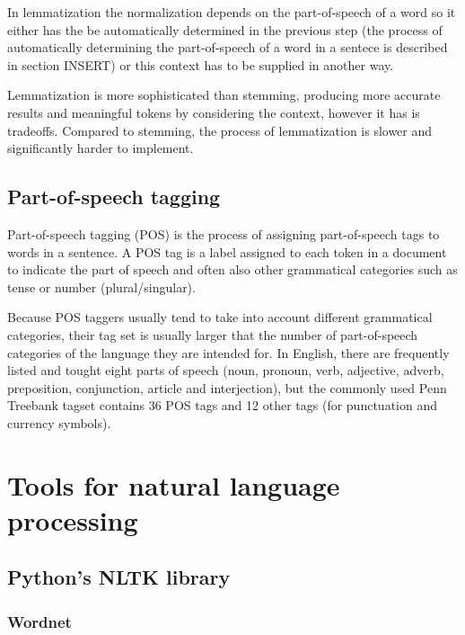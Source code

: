 In lemmatization the normalization depends on the part-of-speech of a word so it either has the be automatically determined in the previous step (the process of automatically determining the part-of-speech of a word in a sentece is described in section INSERT) or this context has to be supplied in another way. 

Lemmatization is more sophisticated than stemming, producing more accurate results and meaningful tokens by considering the context, however it has is tradeoffs. Compared to stemming, the process of lemmatization is slower and significantly harder to implement.
\subsection{Part-of-speech tagging}
Part-of-speech tagging (POS) is the process of assigning part-of-speech tags to words in a sentence. A POS tag is a label assigned to each token in a document to indicate the part of speech  and often also other grammatical categories such as tense or number (plural/singular).\cite{pos}

Because POS taggers usually tend to take into account different grammatical categories, their tag set is usually larger that the number of part-of-speech categories of the language they are intended for. In English, there are frequently listed and tought eight parts of speech (noun, pronoun, verb, adjective, adverb, preposition, conjunction, article and interjection), but the commonly used Penn Treebank tagset contains 36 POS tags and 12 other tags (for punctuation and currency symbols).\cite{penn_treebank}
\section{Tools for natural language processing}
\subsection{Python's NLTK library}
\subsubsection{Wordnet}